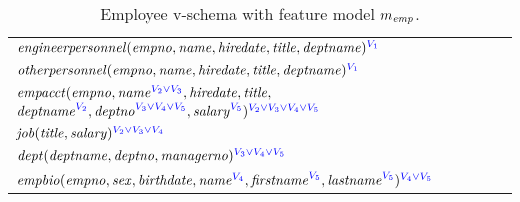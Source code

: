 \begin{table}
\caption{ Employee v-schema with feature model $\fModel_\employee$.}
\vspace{-8pt}
\label{tab:emp-vsch}
\begin{center}
\small
\begin{tabular} {|l|l|}
\hline
\rule{0pt}{3ex}%
$\engemp(\empno, \name, \hiredate,\titleatt,\deptname)^{\textcolor{blue}
\vOne}$ \\[1.1ex]
$\othemp(\empno, \name, \hiredate, \titleatt, \deptname)^{\textcolor{blue}
\vOne}$ \\[1.1ex]
$\empacct(\empno, \annot [\textcolor{blue}{\vTwo \vee \vThree}] \name,
\hiredate, \titleatt,$ 
$\annot[\textcolor{blue} \vTwo]\deptname, \annot
[\textcolor{blue} {\vThree \vee \vFour \vee \vFive}]\deptno,\annot
[\textcolor{blue} \vFive]\salary)^{\textcolor{blue}{\vTwo \vee \vThree \vee
\vFour \vee \vFive}}$ \\[1.1ex]
$\job(\titleatt, \salary)^{\textcolor{blue}{\vTwo \vee \vThree \vee \vFour}}$
\\[1.1ex]
$\dept(\deptname, \deptno, \managerno)^{\textcolor{blue}{\vThree \vee \vFour
\vee \vFive}}$ \\[1.1ex]
$\empbio(\empno, \sex, \birthdate, \annot [\textcolor{blue} \vFour] \name,
\annot[\textcolor{blue}\vFive]{\fname}, \annot[\textcolor{blue}
\vFive]{\lname})^{\textcolor{blue} {\vFour \vee \vFive}}$ \\
\hline
\end{tabular}
\vspace{-12pt}
\end{center}
\end{table}
